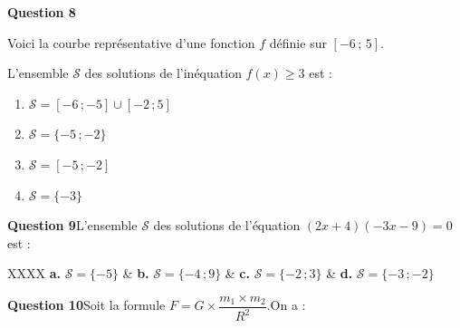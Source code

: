 	\medskip
	
	\begin{minipage}{0.5\linewidth}
		\textbf{Question 8}
		
		Voici la courbe représentative d'une fonction $f$ définie sur $[-6\,;\,5]$.
		
		L'ensemble $\mathcal{S}$ des solutions de l'inéquation \quad $f(x)\geqslant 3$ \quad est :
		
		\begin{enumerate}[label=\textbf{\alph*.},leftmargin=*]
			\item $\mathcal{S}=[-6\,;-5]\cup[-2\,;5]$
			\item $\mathcal{S}=\{-5\,;-2\}$
			\item $\mathcal{S}=[-5\,;-2]$
			\item $\mathcal{S}=\{-3\}$
		\end{enumerate}
	\end{minipage}
	\hfill
	\begin{minipage}{0.46\linewidth}
		\begin{center}
		\end{center}
	\end{minipage}
	
	\medskip
	
	\textbf{Question 9}\quad L'ensemble $\mathcal{S}$ des solutions de l'équation \quad $(2x+4)(-3x-9)=0$ \quad est :
	
	\begin{tblr}{XXXX}
		\textbf{a.} $\mathcal{S}=\{-5\}$ & \textbf{b.} $\mathcal{S}=\{-4\,;9\}$ & \textbf{c.} $\mathcal{S}=\{-2\,;3\}$ & \textbf{d.} $\mathcal{S}=\{-3\,;-2\}$ \\
	\end{tblr}
	
	\medskip
	
	\textbf{Question 10}\quad Soit la formule \quad $F=G\times\dfrac{m_{1}\times m_{2}}{R^{2}}$.\quad On a :
	
